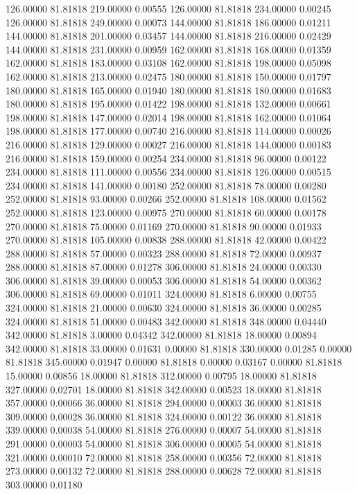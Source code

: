 126.00000 81.81818 219.00000 0.00555
126.00000 81.81818 234.00000 0.00245
126.00000 81.81818 249.00000 0.00073
144.00000 81.81818 186.00000 0.01211
144.00000 81.81818 201.00000 0.03457
144.00000 81.81818 216.00000 0.02429
144.00000 81.81818 231.00000 0.00959
162.00000 81.81818 168.00000 0.01359
162.00000 81.81818 183.00000 0.03108
162.00000 81.81818 198.00000 0.05098
162.00000 81.81818 213.00000 0.02475
180.00000 81.81818 150.00000 0.01797
180.00000 81.81818 165.00000 0.01940
180.00000 81.81818 180.00000 0.01683
180.00000 81.81818 195.00000 0.01422
198.00000 81.81818 132.00000 0.00661
198.00000 81.81818 147.00000 0.02014
198.00000 81.81818 162.00000 0.01064
198.00000 81.81818 177.00000 0.00740
216.00000 81.81818 114.00000 0.00026
216.00000 81.81818 129.00000 0.00027
216.00000 81.81818 144.00000 0.00183
216.00000 81.81818 159.00000 0.00254
234.00000 81.81818 96.00000 0.00122
234.00000 81.81818 111.00000 0.00556
234.00000 81.81818 126.00000 0.00515
234.00000 81.81818 141.00000 0.00180
252.00000 81.81818 78.00000 0.00280
252.00000 81.81818 93.00000 0.00266
252.00000 81.81818 108.00000 0.01562
252.00000 81.81818 123.00000 0.00975
270.00000 81.81818 60.00000 0.00178
270.00000 81.81818 75.00000 0.01169
270.00000 81.81818 90.00000 0.01933
270.00000 81.81818 105.00000 0.00838
288.00000 81.81818 42.00000 0.00422
288.00000 81.81818 57.00000 0.00323
288.00000 81.81818 72.00000 0.00937
288.00000 81.81818 87.00000 0.01278
306.00000 81.81818 24.00000 0.00330
306.00000 81.81818 39.00000 0.00053
306.00000 81.81818 54.00000 0.00362
306.00000 81.81818 69.00000 0.01011
324.00000 81.81818 6.00000 0.00755
324.00000 81.81818 21.00000 0.00630
324.00000 81.81818 36.00000 0.00285
324.00000 81.81818 51.00000 0.00483
342.00000 81.81818 348.00000 0.04440
342.00000 81.81818 3.00000 0.04342
342.00000 81.81818 18.00000 0.00894
342.00000 81.81818 33.00000 0.01631
0.00000 81.81818 330.00000 0.01285
0.00000 81.81818 345.00000 0.01947
0.00000 81.81818 0.00000 0.03167
0.00000 81.81818 15.00000 0.00856
18.00000 81.81818 312.00000 0.00795
18.00000 81.81818 327.00000 0.02701
18.00000 81.81818 342.00000 0.00523
18.00000 81.81818 357.00000 0.00066
36.00000 81.81818 294.00000 0.00003
36.00000 81.81818 309.00000 0.00028
36.00000 81.81818 324.00000 0.00122
36.00000 81.81818 339.00000 0.00038
54.00000 81.81818 276.00000 0.00007
54.00000 81.81818 291.00000 0.00003
54.00000 81.81818 306.00000 0.00005
54.00000 81.81818 321.00000 0.00010
72.00000 81.81818 258.00000 0.00356
72.00000 81.81818 273.00000 0.00132
72.00000 81.81818 288.00000 0.00628
72.00000 81.81818 303.00000 0.01180
